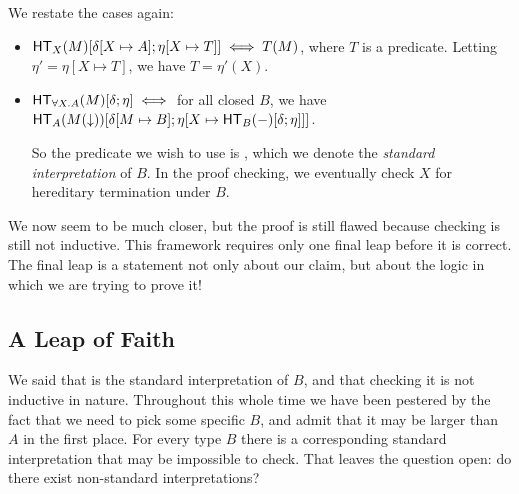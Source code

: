 \documentclass{article}
\begin{document}
We restate the cases again:
\begin{itemize}
\item $\mathsf{HT}_{X}(M)[\delta[X\mapsto A];\eta[X\mapsto T]] \iff T(M)$, where $T$ is a predicate.
      Letting $\eta' = \eta[X \mapsto T]$, we have $T = \eta'(X)$.

\item $\mathsf{HT}_{\forall X. A}(M)[\delta;\eta] \iff $ for all closed $B$, we have
      $\mathsf{HT}_{A}(M(\downarrow))[\delta[M \mapsto B];\eta[X \mapsto \mathsf{HT}_{B}(-)[\delta;\eta]]]$.

      So the predicate we wish to use is , which we denote the
      \emph{standard interpretation} of $B$. In the proof checking, we eventually check $X$ for
      hereditary termination under $B$.
\end{itemize}

We now seem to be much closer, but the proof is still flawed because checking 
is still not inductive. This framework requires only one final leap before it is correct. The final
leap is a statement not only about our claim, but about the logic in which we are trying to prove it!

\subsection{A Leap of Faith}


We said that  is the standard interpretation of $B$, and that checking
it is not inductive in nature. Throughout this whole time we have been pestered by the fact that
we need to pick some specific $B$, and admit that it may be larger than $A$ in the first place.
For every type $B$ there is a corresponding standard interpretation that may be impossible to check.
That leaves the question open: do there exist non-standard interpretations?


\begin{center}
\end{center}
\end{document}
